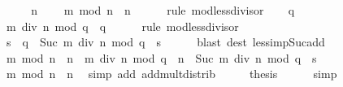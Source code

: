 \begin{isabellebody}
%
\isadelimproof
%
\endisadelimproof
%
\isatagproof
{}\isamarkupfalse%
\ {\isacharminus}{\kern0pt}\isanewline
\ \ \isamarkupfalse%
\ {\isacartoucheopen}n\ {\isachargreater}{\kern0pt}\ {}{\isacartoucheclose}\ \isamarkupfalse%
\ {\isachardoublequoteopen}m\ mod\ n\ {\isacharless}{\kern0pt}\ n{\isachardoublequoteclose}\isanewline
\ \ \ \ \isamarkupfalse%
\ {\isacharparenleft}{\kern0pt}rule\ mod{\isacharunderscore}{\kern0pt}less{\isacharunderscore}{\kern0pt}divisor{\isacharparenright}{\kern0pt}\isanewline
\ \ \isamarkupfalse%
\ {\isacartoucheopen}q\ {\isachargreater}{\kern0pt}\ {}{\isacartoucheclose}\ \isamarkupfalse%
\ {\isachardoublequoteopen}m\ div\ n\ mod\ q\ {\isacharless}{\kern0pt}\ q{\isachardoublequoteclose}\isanewline
\ \ \ \ \isamarkupfalse%
\ {\isacharparenleft}{\kern0pt}rule\ mod{\isacharunderscore}{\kern0pt}less{\isacharunderscore}{\kern0pt}divisor{\isacharparenright}{\kern0pt}\isanewline
\ \ \isamarkupfalse%
\ \isamarkupfalse%
\ s\ \ {\isachardoublequoteopen}q\ {\isacharequal}{\kern0pt}\ Suc\ {\isacharparenleft}{\kern0pt}m\ div\ n\ mod\ q\ {\isacharplus}{\kern0pt}\ s{\isacharparenright}{\kern0pt}{\isachardoublequoteclose}\isanewline
\ \ \ \ \isamarkupfalse%
\ {\isacharparenleft}{\kern0pt}blast\ dest{\isacharcolon}{\kern0pt}\ less{\isacharunderscore}{\kern0pt}imp{\isacharunderscore}{\kern0pt}Suc{\isacharunderscore}{\kern0pt}add{\isacharparenright}{\kern0pt}\isanewline
\ \ \isamarkupfalse%
\ \isamarkupfalse%
\ {\isachardoublequoteopen}m\ mod\ n\ {\isacharplus}{\kern0pt}\ n\ {\isacharasterisk}{\kern0pt}\ {\isacharparenleft}{\kern0pt}m\ div\ n\ mod\ q{\isacharparenright}{\kern0pt}\ {\isacharless}{\kern0pt}\ n\ {\isacharasterisk}{\kern0pt}\ Suc\ {\isacharparenleft}{\kern0pt}m\ div\ n\ mod\ q\ {\isacharplus}{\kern0pt}\ s{\isacharparenright}{\kern0pt}{\isachardoublequoteclose}\isanewline
\ \ \ \ \isamarkupfalse%
\ {\isacartoucheopen}m\ mod\ n\ {\isacharless}{\kern0pt}\ n{\isacartoucheclose}\ \isamarkupfalse%
\ {\isacharparenleft}{\kern0pt}simp\ add{\isacharcolon}{\kern0pt}\ add{\isacharunderscore}{\kern0pt}mult{\isacharunderscore}{\kern0pt}distrib{}{\isacharparenright}{\kern0pt}\isanewline
\ \ \isamarkupfalse%
\ \isamarkupfalse%
\ {\isacharquery}{\kern0pt}thesis\isanewline
\ \ \ \ \isamarkupfalse%
\ simp\isanewline

\end{isabellebody}
